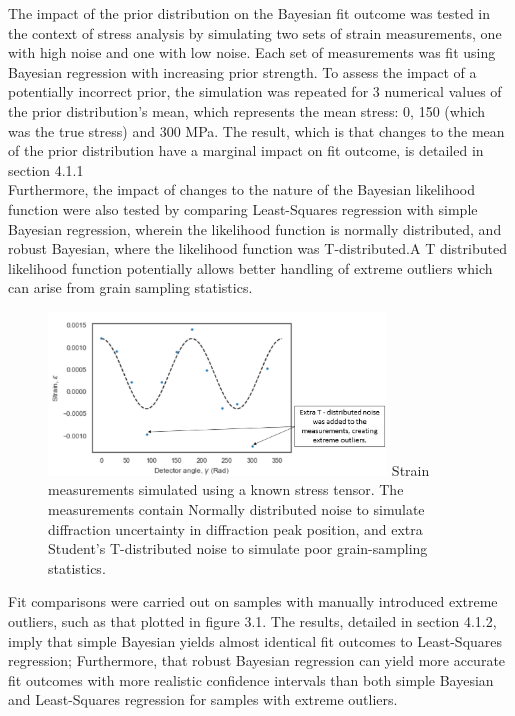 The impact of the prior distribution on the Bayesian fit outcome was tested in the context of stress analysis by simulating two sets of strain measurements, one with high noise and one with low noise. Each set of measurements was fit using Bayesian regression with increasing prior strength. To assess the impact of a potentially incorrect prior, the simulation was repeated for 3 numerical values of the prior distribution's mean, which represents the mean stress: 0, 150 (which was the true stress) and 300 MPa. The result, which is that changes to the mean of the prior distribution have a marginal impact on fit outcome, is detailed in section 4.1.1\\

Furthermore, the impact of changes to the nature of the Bayesian likelihood function were also tested by comparing Least-Squares regression with simple Bayesian regression, wherein the likelihood function \cite{dendukuri_2018_lecture} is normally distributed, and robust Bayesian, where the likelihood function was T-distributed.A T distributed likelihood function potentially allows better handling of extreme outliers which can arise from grain sampling statistics.\cite{lange_1989_robust}\\

 \begin{figure}[H]
 	\centering
 	\includegraphics[width=0.8\textwidth]{chapters/chapter02/fig02/outliers.png}
 	\mycaption
 	{Strain measurements simulated using a known stress tensor. The measurements contain Normally distributed noise to simulate diffraction uncertainty in diffraction peak position, and extra Student's T-distributed noise to simulate poor grain-sampling statistics.}
    \label{fig:RHP02}
 \end{figure}
 
Fit comparisons were carried out on samples with manually introduced extreme outliers, such as that plotted in figure 3.1. The results, detailed in section 4.1.2, imply that simple Bayesian yields almost identical fit outcomes to Least-Squares regression; Furthermore, that robust Bayesian regression can yield more accurate fit outcomes with more realistic confidence intervals than both simple Bayesian and Least-Squares regression for samples with extreme outliers.\\


